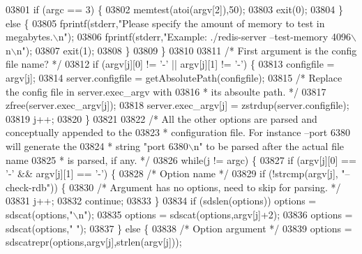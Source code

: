 \begin{DoxyCode}
{{{{{{{{{{{{{{{{{{{{{{{{{{{{{{{{{{{{{{{{{{{{{{{{{{{{{{{{{{{{{{{{{{{{{{{{{{{{{{{{{{{{{{{{{{{{{{{{{{{{{{{{{{{{{{{{{{{{{{{{{{{{{{{{{{{{{{{{{{{{{{{{{{{{{{{{{{{{{{{{{{{{{{{{{{{{{{{{{{03801             \textcolor{keywordflow}{if} (argc == 3) \{
03802                 memtest(atoi(argv[2]),50);
03803                 exit(0);
03804             \} \textcolor{keywordflow}{else} \{
03805                 fprintf(stderr,\textcolor{stringliteral}{"Please specify the amount of memory to test in megabytes.\(\backslash\)n"});
03806                 fprintf(stderr,\textcolor{stringliteral}{"Example: ./redis-server --test-memory 4096\(\backslash\)n\(\backslash\)n"});
03807                 exit(1);
03808             \}
03809         \}
03810 
03811         \textcolor{comment}{/* First argument is the config file name? */}
03812         \textcolor{keywordflow}{if} (argv[j][0] != \textcolor{stringliteral}{'-'} || argv[j][1] != \textcolor{stringliteral}{'-'}) \{
03813             configfile = argv[j];
03814             server.configfile = getAbsolutePath(configfile);
03815             \textcolor{comment}{/* Replace the config file in server.exec\_argv with}
03816 \textcolor{comment}{             * its absoulte path. */}
03817             zfree(server.exec\_argv[j]);
03818             server.exec\_argv[j] = zstrdup(server.configfile);
03819             j++;
03820         \}
03821 
03822         \textcolor{comment}{/* All the other options are parsed and conceptually appended to the}
03823 \textcolor{comment}{         * configuration file. For instance --port 6380 will generate the}
03824 \textcolor{comment}{         * string "port 6380\(\backslash\)n" to be parsed after the actual file name}
03825 \textcolor{comment}{         * is parsed, if any. */}
03826         \textcolor{keywordflow}{while}(j != argc) \{
03827             \textcolor{keywordflow}{if} (argv[j][0] == \textcolor{stringliteral}{'-'} && argv[j][1] == \textcolor{stringliteral}{'-'}) \{
03828                 \textcolor{comment}{/* Option name */}
03829                 \textcolor{keywordflow}{if} (!strcmp(argv[j], \textcolor{stringliteral}{"--check-rdb"})) \{
03830                     \textcolor{comment}{/* Argument has no options, need to skip for parsing. */}
03831                     j++;
03832                     \textcolor{keywordflow}{continue};
03833                 \}
03834                 \textcolor{keywordflow}{if} (sdslen(options)) options = sdscat(options,\textcolor{stringliteral}{"\(\backslash\)n"});
03835                 options = sdscat(options,argv[j]+2);
03836                 options = sdscat(options,\textcolor{stringliteral}{" "});
03837             \} \textcolor{keywordflow}{else} \{
03838                 \textcolor{comment}{/* Option argument */}
03839                 options = sdscatrepr(options,argv[j],strlen(argv[j]));
}}}}}}}}}}}}}}}}}}}}}}}}}}}}}}}}}}}}}}}}}}}}}}}}}}}}}}}}}}}}}}}}}}}}}}}}}}}}}}}}}}}}}}}}}}}}}}}}}}}}}}}}}}}}}}}}}}}}}}}}}}}}}}}}}}}}}}}}}}}}}}}}}}}}}}}}}}}}}}}}}}}}}}}}}}}}}}}}}}
\end{DoxyCode}
